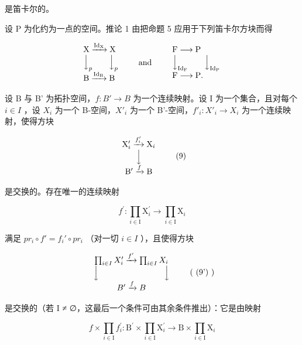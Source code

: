 是笛卡尔的。

设 P 为化约为一点的空间。推论 1 由把命题 5 应用于下列笛卡尔方块而得

\[
\begin{array}{l} \mathrm{X} \xrightarrow {\mathrm{Id} _ {\mathrm{X}}} \mathrm{X} \\ \Big \downarrow_ {p} \qquad \Big \downarrow_ {p} \\ \mathrm{B} \xrightarrow {\mathrm{Id} _ {\mathrm{B}}} \mathrm{B} \end{array} \qquad \text {and} \qquad \begin{array}{l} \mathrm{F} \longrightarrow \mathrm{P} \\ \Big \downarrow_ {\mathrm{Id} _ {\mathrm{F}}} \qquad \Big \downarrow_ {\mathrm{Id} _ {\mathrm{P}}} \\ \mathrm{F} \longrightarrow \mathrm{P}. \end{array}
\]

设 B 与 B' 为拓扑空间，\(f: B' \to B\) 为一个连续映射。设 I 为一个集合，且对每个 \(i \in I\) ，设 \(X_i\) 为一个 B-空间，\(X'_i\) 为一个 B'-空间，\(f'_i: X'_i \to X_i\) 为一个连续映射，使得方块

\[
\begin{array}{c} \mathrm{X} _ {i} ^ {\prime} \xrightarrow {f _ {i} ^ {\prime}} \mathrm{X} _ {i} \\ \Big \downarrow \\ \mathrm{B} ^ {\prime} \xrightarrow {f} \mathrm{B} \end{array}\tag{9}
\]

是交换的。存在唯一的连续映射

\[
f ^ {\prime} \colon \prod_ {i \in \mathrm{I}} \mathrm{X} _ {i} ^ {\prime} \to \prod_ {i \in \mathrm{I}} \mathrm{X} _ {i}
\]

满足 \(pr_{i} \circ f' = f_{i}' \circ pr_{i}\) （对一切 \(i \in I\) ），且使得方块

\[
\begin{array}{c} \prod_ {i \in I} X _ {i} ^ {\prime} \xrightarrow {f ^ {\prime}} \prod_ {i \in I} X _ {i} \\ \Big \downarrow \qquad \qquad \qquad \qquad \Big \downarrow \\ B ^ {\prime} \xrightarrow {f} B \end{array}\tag{ (9') }
\]

是交换的（若 I ≠ ∅，这最后一个条件可由其余条件推出）：它是由映射

\[
f \times \prod_ {i \in \mathrm{I}} f _ {i} ^ {\prime} \colon \mathrm{B} ^ {\prime} \times \prod_ {i \in \mathrm{I}} \mathrm{X} _ {i} ^ {\prime} \to \mathrm{B} \times \prod_ {i \in \mathrm{I}} \mathrm{X} _ {i}
\]

